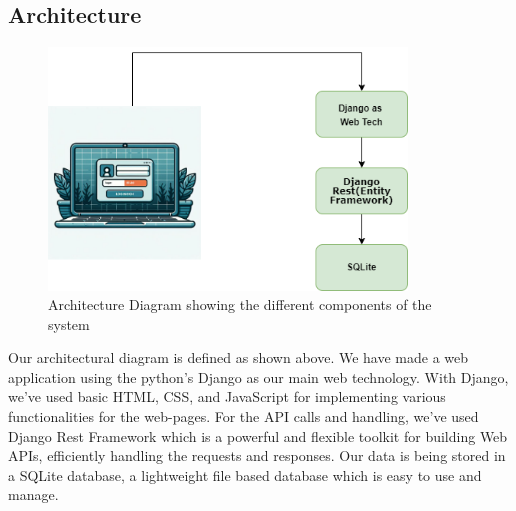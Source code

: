 \subsection{Architecture}
\begin{figure}[htbp]
    \centering
    \includegraphics[width=0.85\textwidth]{images/Architecture Diagram.png}
    \caption{Architecture Diagram showing the different components of the system}
\end{figure}
Our architectural diagram is defined as shown above. We have made a web application using the python's Django as our main web technology. With Django, we've used basic HTML, CSS, and JavaScript for implementing various functionalities for the web-pages. For the API calls and handling, we've used Django Rest Framework which is a powerful and flexible toolkit for building Web APIs, efficiently handling the requests and responses. Our data is being stored in a SQLite database, a lightweight file based database which is easy to use and manage. 





